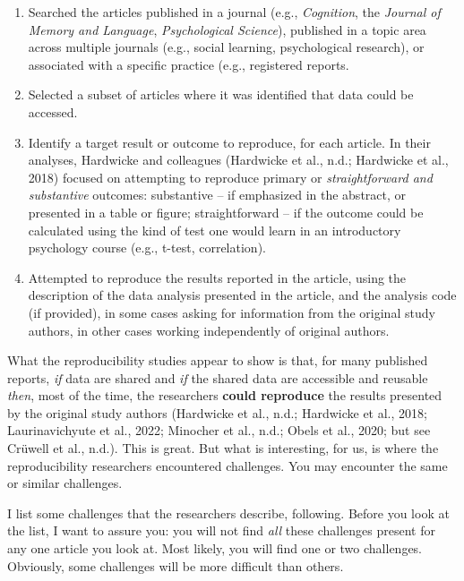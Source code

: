 \documentclass[
  letterpaper,
  DIV=11,
  numbers=noendperiod]{scrreprt}
\providecommand{\tightlist}{%
  \setlength{\itemsep}{0pt}\setlength{\parskip}{0pt}}\usepackage{longtable,booktabs,array}
\begin{document}
\begin{enumerate}
\def\labelenumi{\arabic{enumi}.}
\tightlist
\item
  Searched the articles published in a journal (e.g., \emph{Cognition},
  the \emph{Journal of Memory and Language}, \emph{Psychological
  Science}), published in a topic area across multiple journals (e.g.,
  social learning, psychological research), or associated with a
  specific practice (e.g., registered reports.
\item
  Selected a subset of articles where it was identified that data could
  be accessed.
\item
  Identify a target result or outcome to reproduce, for each article. In
  their analyses, Hardwicke and colleagues (Hardwicke et al., n.d.;
  Hardwicke et al., 2018) focused on attempting to reproduce primary or
  \emph{straightforward and substantive} outcomes: substantive -- if
  emphasized in the abstract, or presented in a table or figure;
  straightforward -- if the outcome could be calculated using the kind
  of test one would learn in an introductory psychology course (e.g.,
  t-test, correlation).
\item
  Attempted to reproduce the results reported in the article, using the
  description of the data analysis presented in the article, and the
  analysis code (if provided), in some cases asking for information from
  the original study authors, in other cases working independently of
  original authors.
\end{enumerate}

What the reproducibility studies appear to show is that, for many
published reports, \emph{if} data are shared and \emph{if} the shared
data are accessible and reusable \emph{then}, most of the time, the
researchers \textbf{could reproduce} the results presented by the
original study authors (Hardwicke et al., n.d.; Hardwicke et al., 2018;
Laurinavichyute et al., 2022; Minocher et al., n.d.; Obels et al., 2020;
but see Crüwell et al., n.d.). This is great. But what is interesting,
for us, is where the reproducibility researchers encountered challenges.
You may encounter the same or similar challenges.

I list some challenges that the researchers describe, following. Before
you look at the list, I want to assure you: you will not find \emph{all}
these challenges present for any one article you look at. Most likely,
you will find one or two challenges. Obviously, some challenges will be
more difficult than others.
\end{document}
